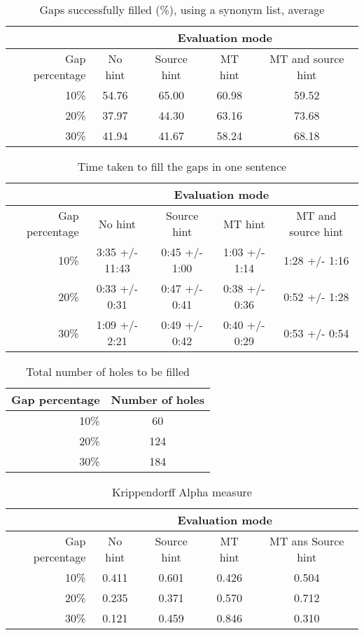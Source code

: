 \documentclass[11pt, oneside]{article}   	%
\begin{document}
\begin{table}[H]
\centering
\begin{tabular}{|r |*{4}{c}|}
\hline
 &\multicolumn{4}{c|}{Evaluation mode}\\
\hline
Gap percentage & No hint & Source hint & MT hint & MT and source hint\\
\hline
10\%&54.76&65.00&60.98&59.52\\
20\%&37.97&44.30&63.16&73.68\\
30\%&41.94&41.67&58.24&68.18\\
\hline
\end{tabular}
\caption {Gaps successfully filled (\%), using a synonym list, average} \label{tab:title} 
\end{table}

\begin{table}[H]
\centering
\begin{tabular}{|r |*{4}{c}|}
\hline
 &\multicolumn{4}{c|}{Evaluation mode}\\
\hline
Gap percentage & No hint & Source hint & MT hint & MT and source hint\\
\hline
10\%&3:35 +/- 11:43&0:45 +/- 1:00&1:03 +/- 1:14&1:28 +/- 1:16\\
20\%&0:33 +/- 0:31&0:47 +/- 0:41&0:38 +/- 0:36&0:52 +/- 1:28\\
30\%&1:09 +/- 2:21&0:49 +/- 0:42&0:40 +/- 0:29&0:53 +/- 0:54\\
\hline
\end{tabular}
\caption {Time taken to fill the gaps in one sentence} \label{tab:title} 
\end{table}

\begin{table}[H]
\centering
\begin{tabular}{|r |*{1}{c}|}
\hline
Gap percentage & Number of holes\\
\hline
10\%&60\\
20\%&124\\
30\%&184\\
\hline
\end{tabular}
\caption {Total number of holes to be filled} \label{tab:title}
\end{table}

\begin{table}[H]
\centering
\begin{tabular}{|r |*{4}{c}|}
\hline
 &\multicolumn{4}{c|}{Evaluation mode}\\
\hline
Gap percentage & No hint & Source hint & MT hint & MT ans Source hint\\
\hline
10\%&0.411 &0.601 &0.426 &0.504\\
20\%&0.235 &0.371 &0.570 &0.712\\
30\%&0.121 &0.459 &0.846 &0.310\\
\hline
\end{tabular}
\caption {Krippendorff Alpha measure} \label{tab:title}
\end{table}
\end{document}
